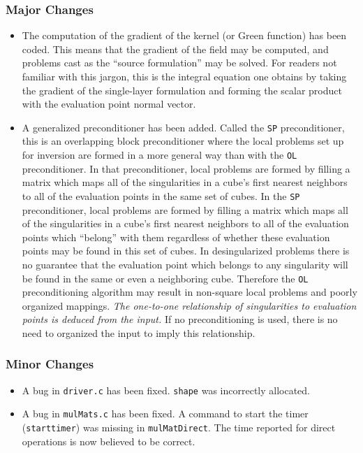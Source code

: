 \subsubsection{Major Changes}
\begin{itemize}
\item{The computation of the gradient of the kernel (or Green function) has been coded.}  
This means that the gradient of the field may be computed,
and problems cast as the ``source formulation'' may be solved.
For readers not familiar with this jargon, this is the integral equation 
one obtains by taking the gradient of the single-layer formulation and
forming the scalar product with the evaluation point normal vector.

\item{A generalized preconditioner has been added.}  Called the {\tt SP}
preconditioner, this is an overlapping block preconditioner where the 
local problems set up for inversion are formed in a more general way than 
with the  {\tt OL} preconditioner.  In that preconditioner, local problems
are formed by filling a matrix which maps all of the singularities in a 
cube's first nearest neighbors to all of the evaluation points in the same
set of cubes.  In the  {\tt SP} preconditioner, local problems are formed
by filling a matrix  which maps all of the singularities in a 
cube's first nearest neighbors to all of the evaluation points which ``belong''
with them regardless of whether these evaluation points may be found in 
this set of cubes.  In desingularized problems there is no guarantee that 
the evaluation point which belongs to any singularity will be found in the
same or even a neighboring cube.  Therefore the  {\tt OL} preconditioning
algorithm may result in non-square local problems and poorly organized 
mappings.  {\it The one-to-one relationship of singularities to evaluation 
points is deduced from the input.}  If no preconditioning is used, there
is no need to organized the input to imply this relationship.
\end{itemize}

\subsubsection{Minor Changes}
\begin{itemize}
\item{A bug in {\tt driver.c} has been fixed.}  {\tt shape} was incorrectly
allocated.  
\item{A bug in {\tt mulMats.c} has been fixed.}  A command to start the timer
({\tt starttimer}) was missing in {\tt mulMatDirect}.  The time reported for
direct operations is now believed to be correct.
\end{itemize}

